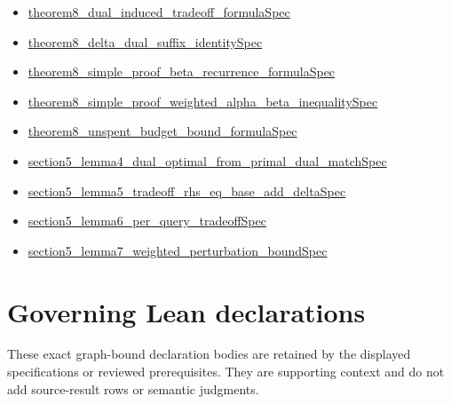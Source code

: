 \documentclass[10pt]{article}
\begin{document}
\begin{itemize}[leftmargin=1.2em]
\begin{itemize}[leftmargin=1.2em]
\item \hyperlink{source-claim-7ece82b2d9fe4810}{theorem8\_\allowbreak{}dual\_\allowbreak{}induced\_\allowbreak{}tradeoff\_\allowbreak{}formula\allowbreak{}Spec}
\item \hyperlink{source-claim-8da75fcd3b4daadd}{theorem8\_\allowbreak{}delta\_\allowbreak{}dual\_\allowbreak{}suffix\_\allowbreak{}identity\allowbreak{}Spec}
\item \hyperlink{source-claim-d6133428f4c419d0}{theorem8\_\allowbreak{}simple\_\allowbreak{}proof\_\allowbreak{}beta\_\allowbreak{}recurrence\_\allowbreak{}formula\allowbreak{}Spec}
\item \hyperlink{source-claim-a44d779de9d258a2}{theorem8\_\allowbreak{}simple\_\allowbreak{}proof\_\allowbreak{}weighted\_\allowbreak{}alpha\_\allowbreak{}beta\_\allowbreak{}inequality\allowbreak{}Spec}
\item \hyperlink{source-claim-4901b9feb2aff9e9}{theorem8\_\allowbreak{}unspent\_\allowbreak{}budget\_\allowbreak{}bound\_\allowbreak{}formula\allowbreak{}Spec}
\item \hyperlink{source-claim-f5f74a26e3d17ad7}{section5\_\allowbreak{}lemma4\_\allowbreak{}dual\_\allowbreak{}optimal\_\allowbreak{}from\_\allowbreak{}primal\_\allowbreak{}dual\_\allowbreak{}match\allowbreak{}Spec}
\item \hyperlink{source-claim-550ad01ce2e2cdce}{section5\_\allowbreak{}lemma5\_\allowbreak{}tradeoff\_\allowbreak{}rhs\_\allowbreak{}eq\_\allowbreak{}base\_\allowbreak{}add\_\allowbreak{}delta\allowbreak{}Spec}
\item \hyperlink{source-claim-2aa161d90efd4a9f}{section5\_\allowbreak{}lemma6\_\allowbreak{}per\_\allowbreak{}query\_\allowbreak{}tradeoff\allowbreak{}Spec}
\item \hyperlink{source-claim-c102fc02873e5d38}{section5\_\allowbreak{}lemma7\_\allowbreak{}weighted\_\allowbreak{}perturbation\_\allowbreak{}bound\allowbreak{}Spec}
\end{itemize}
\end{itemize}

\clearpage
\hypertarget{governing-declaration-section-5ef5ef0364b6939c}{}
\section*{Governing Lean declarations}
These exact graph-bound declaration bodies are retained by the displayed specifications or reviewed prerequisites. They are supporting context and do not add source-result rows or semantic judgments.
\hypertarget{governing-declaration-e5ce49672bf26ab1}{}
\end{document}
